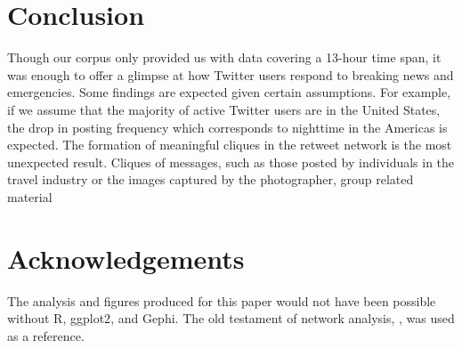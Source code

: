 \documentclass[a4paper, 11pt, titlepage]{article}
\begin{document}


\section{Conclusion}
Though our corpus only provided us with data covering a 13-hour time span, it was enough to offer a glimpse at how Twitter users respond to breaking news and emergencies.  Some findings are expected given certain assumptions.  For example, if we assume that the majority of active Twitter users are in the United States, the drop in posting frequency which corresponds to nighttime in the Americas is expected.  The formation of meaningful cliques in the retweet network is the most unexpected result.  Cliques of messages, such as those posted by individuals in the travel industry or the images captured by the photographer, group related material

\section{Acknowledgements}

The analysis and figures produced for this paper would not have been possible without R\cite{R}, ggplot2\cite{wickham2008ggplot2, wickham2009ggplot2}, and Gephi\cite{bastian2009gephi}.
The old testament of network analysis, \cite{wasserman1994sna}, was used as a reference.



\end{document}
